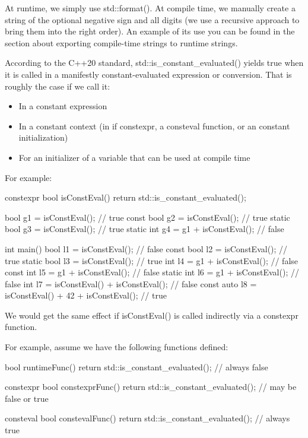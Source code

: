 At runtime, we simply use std::format(). At compile time, we manually create a string of the optional negative sign and all digits (we use a recursive approach to bring them into the right order). An example of its use you can be found in the section about exporting compile-time strings to runtime strings.



According to the C++20 standard, std::is\_constant\_evaluated() yields true when it is called in a manifestly constant-evaluated expression or conversion. That is roughly the case if we call it:

\begin{itemize}
\item 
In a constant expression

\item 
In a constant context (in if constexpr, a consteval function, or an constant initialization)

\item 
For an initializer of a variable that can be used at compile time
\end{itemize}

For example:

\begin{cpp}
constexpr bool isConstEval() {
	return std::is_constant_evaluated();
}

bool g1 = isConstEval(); // true
const bool g2 = isConstEval(); // true
static bool g3 = isConstEval(); // true
static int g4 = g1 + isConstEval(); // false

int main()
{
	bool l1 = isConstEval(); // false
	const bool l2 = isConstEval(); // true
	static bool l3 = isConstEval(); // true
	int l4 = g1 + isConstEval(); // false
	const int l5 = g1 + isConstEval(); // false
	static int l6 = g1 + isConstEval(); // false
	int l7 = isConstEval() + isConstEval(); // false
	const auto l8 = isConstEval() + 42 + isConstEval(); // true
}
\end{cpp}

We would get the same effect if isConstEval() is called indirectly via a constexpr function.


For example, assume we have the following functions defined:

\begin{cpp}
bool runtimeFunc() {
	return std::is_constant_evaluated(); // always false
}

constexpr bool constexprFunc() {
	return std::is_constant_evaluated(); // may be false or true
}

consteval bool constevalFunc() {
	return std::is_constant_evaluated(); // always true
}
\end{cpp}

